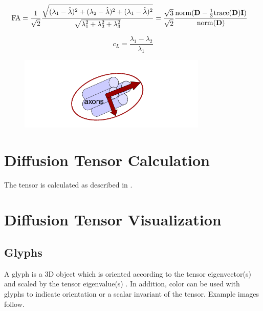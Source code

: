 \documentclass{InsightArticle}
\begin{document}
\begin{eqnarray}
\label{eq:FA}
{\rm FA} &= \frac{1}{\sqrt{2}} \frac{\sqrt{(\lambda_1-\hat\lambda)^2 +
     (\lambda_2-\hat\lambda)^2 + (\lambda_1-\hat\lambda)^2}}
     {\sqrt{\lambda_1^2 + \lambda_2^2 + \lambda_3^2}} =
     \frac{\sqrt{3}}{\sqrt{2}} \frac{{\rm norm}({\bf D} - \frac{1}{3}{\rm
     trace}({\bf D}){\bf I})}{{\rm norm}({\bf D})}
\end{eqnarray}

\begin{equation}
\label{eq:diffMeasuresWestin}
c_L = \frac{\lambda_1 - \lambda_2}{\lambda_1}
\end{equation}

\begin{figure}
\center
\includegraphics[width=0.8\textwidth]{EllipseDiagram}


\label{fig:TensorDiagram}
\end{figure}




\section{Diffusion Tensor Calculation}
The tensor is calculated as described in \cite{}.


\section{Diffusion Tensor Visualization}

\subsection{Glyphs}
A glyph is a 3D object which is oriented according to the tensor
eigenvector(s) and scaled by the tensor eigenvalue(s)
\cite{basserBIOPHYS94,kindlmann04}.  In addition, color can be used
with glyphs to indicate orientation or a scalar invariant of the
tensor.  Example images follow.
\end{document}
